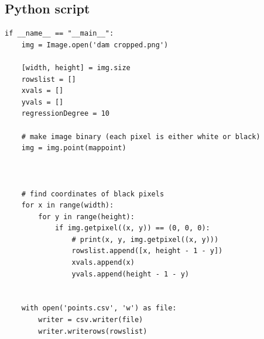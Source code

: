\documentclass[a4paper]{article}
\theoremstyle{definition}
\begin{document}
    \subsection{Python script}\label{secPythonMakeCoordinates}
    \begin{verbatim}
if __name__ == "__main__":
    img = Image.open('dam cropped.png')

    [width, height] = img.size
    rowslist = []
    xvals = []
    yvals = []
    regressionDegree = 10

    # make image binary (each pixel is either white or black)
    img = img.point(mappoint)



    # find coordinates of black pixels
    for x in range(width):
        for y in range(height):
            if img.getpixel((x, y)) == (0, 0, 0):
                # print(x, y, img.getpixel((x, y)))
                rowslist.append([x, height - 1 - y])
                xvals.append(x)
                yvals.append(height - 1 - y)


    with open('points.csv', 'w') as file:
        writer = csv.writer(file)
        writer.writerows(rowslist)
    \end{verbatim}
\end{document}
